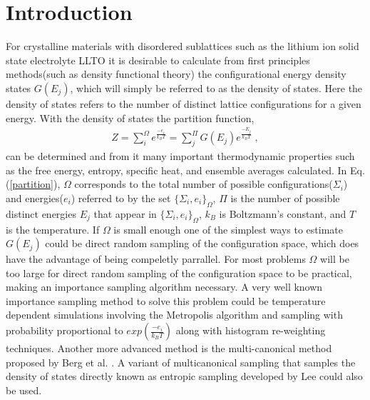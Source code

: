 \documentclass[aps,pre,reprint,superscriptaddress,showkeys]{revtex4-2}
\begin{document}
\section{Introduction}
For crystalline  materials  with disordered sublattices such as the lithium ion solid state electrolyte LLTO it is desirable to calculate from first principles methods(such as density functional theory\cite{kohn:1965}) the configurational energy density states $G(E_j)$, which will simply be referred to as the density of states. Here the  density of states refers to the number of distinct lattice configurations for a given energy. With the  density of states the partition function,
\begin{equation}
\begin{split}
Z = \sum_{i}^{\Omega}e^{\frac{-e_i}{k_B T} }= \sum_{j}^{\Pi}G(E_j)e^{\frac{-E_j}{k_BT}} \;,
\end{split}
\label{partition}
\end{equation}
can be  determined and from it many important thermodynamic properties such as the free energy, entropy, specific heat, and ensemble averages calculated. In Eq. (\ref{partition}), $\Omega$ corresponds to the total number of possible  configurations($\Sigma_i$) and energies($e_i$) referred to by the set $\{\Sigma_i,e_i\}_\Omega$, $\Pi$ is the number of possible distinct energies $E_j$ that appear in $\{\Sigma_i,e_i\}_\Omega$, $k_B$ is Boltzmann's constant, and $T$ is the temperature. If $\Omega$ is small enough one of the simplest ways to estimate $G(E_j)$ could be direct random sampling of the configuration space\cite{partition}, which does have the advantage of being compeletly parrallel. For most problems $\Omega$ will be too large for direct random sampling of the configuration space to be practical, making an importance sampling algorithm necessary. A very well known importance sampling method to solve this problem could be temperature dependent simulations involving the Metropolis algorithm and sampling with probability proportional  to $exp(\frac{-e_i}{k_B T})$ 
along with histogram re-weighting techniques\cite{metropolis_equation_1953,histogram_reweighting, landau_MC_simulations}. Another more advanced method is the multi-canonical method proposed by Berg et al. \cite{Multi_Canonical,multi_canonical_two}. A variant of multicanonical sampling that samples the density of states directly known as entropic sampling developed by Lee \cite{Entropic_Sampling} could also be used. 
\end{document}

